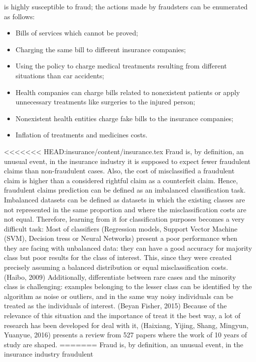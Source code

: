 \documentclass[parskip=full]{scrartcl}
\begin{document}
is highly susceptible to fraud; the actions made by fraudsters can be 
enumerated as follows: 
\begin{itemize}
	\item Bills of services which cannot be proved;
	\item Charging the same bill to different insurance companies;
	\item Using the policy to charge medical treatments resulting from 
	different situations than car accidents;
	\item Health companies can charge bills related to nonexistent patients or 
	apply unnecessary treatments like surgeries to the injured person;
	\item Nonexistent health entities charge fake bills to the insurance 
	companies;
	\item Inflation of treatments and medicines costs.
\end{itemize}
<<<<<<< HEAD:insurance/content/insurance.tex
Fraud is, by definition, an unusual event, in the insurance industry it is 
supposed to expect fewer fraudulent claims than non-fraudulent cases. Also, the 
cost of misclassified a fraudulent claim is higher than a considered rightful 
claim as a counterfeit claim.  Hence, fraudulent claims prediction can be 
defined as an imbalanced classification task. 
Imbalanced datasets can be defined as datasets in which the existing classes 
are not represented in the same proportion and where the misclassification 
costs are not equal. Therefore, learning from it for classification purposes 
becomes a very difficult task: 
Most of classifiers (Regression models, Support Vector Machine (SVM), Decision 
tress or Neural Networks) present a poor performance when they are facing with 
unbalanced data: they can have a good accuracy for majority class but poor 
results for the class of interest.  This, since they were created precisely 
assuming a balanced distribution or equal misclassification costs. (Haibo, 
2009) 
Additionally, differentiate between rare cases and the minority class is 
challenging: examples belonging to the lesser class can be identified by the 
algorithm as noise or outliers, and in the same way noisy individuals can be 
treated as the individuals of interest. (Beyan Fisher, 2015)
Because of the relevance of this situation and the importance of treat it the 
best way, a lot of research has been developed for deal with it, (Haixiang, 
Yijing, Shang, Mingyun, Yuanyue, 2016) presents a review from 527 papers 
where the work of 10 years of study are shaped. 
=======
Fraud is, by definition, an unusual event, in the insurance industry fraudulent 
\end{document}
